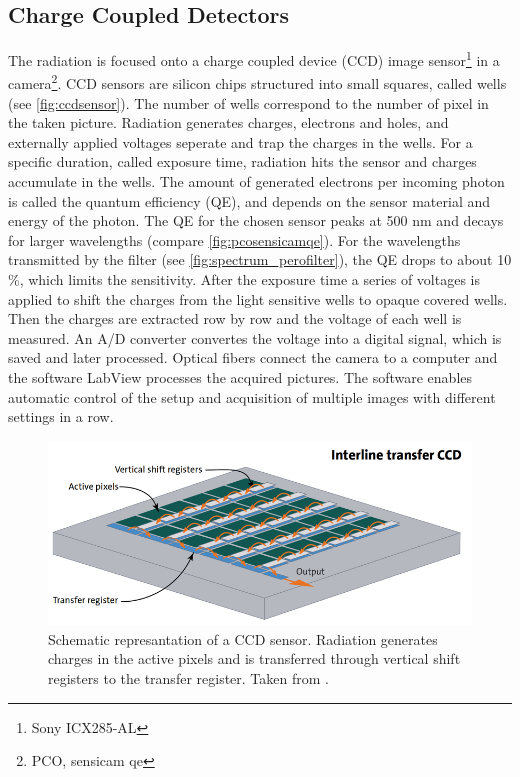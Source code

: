 \subsection{Charge Coupled Detectors}
The radiation is focused onto a charge coupled device (CCD) image sensor\footnote{Sony ICX285-AL} in a camera\footnote{PCO, sensicam qe}. CCD sensors are silicon chips structured into small squares, called wells \cite{SchnellCCD1993}(see \autoref{fig:ccdsensor}). The number of wells correspond to the number of pixel in the taken picture. Radiation generates charges, electrons and holes, and externally applied voltages seperate and trap the charges in the wells. For a specific duration, called exposure time, radiation hits the sensor and charges accumulate in the wells. The amount of generated electrons per incoming photon is called the quantum efficiency (QE), and depends on the sensor material and energy of the photon. The QE for the chosen sensor peaks at 500 nm and decays for larger wavelengths (compare \autoref{fig:pcosensicamqe}). For the wavelengths transmitted by the filter (see \autoref{fig:spectrum_perofilter}), the QE drops to about 10 \%, which limits the sensitivity. After the exposure time a series of voltages is applied to shift the charges from the light sensitive wells to opaque covered wells. Then the charges are extracted row by row and the voltage of each well is measured. An A/D converter convertes the voltage into a digital signal, which is saved and later processed. Optical fibers connect the camera to a computer and the software LabView processes the acquired pictures. The software enables automatic control of the setup and acquisition of multiple images with different settings in a row.

\begin{figure}[h]
	\centering
	\includegraphics[width=\linewidth]{Images/ExperimentalSetup/ccd-sensor-interline-transfer-en}
	\caption{Schematic represantation of a CCD sensor. Radiation generates charges in the active pixels and is transferred through vertical shift registers to the transfer register. Taken from \cite{StemmerCCD}.}
	\label{fig:ccdsensor}
\end{figure}

